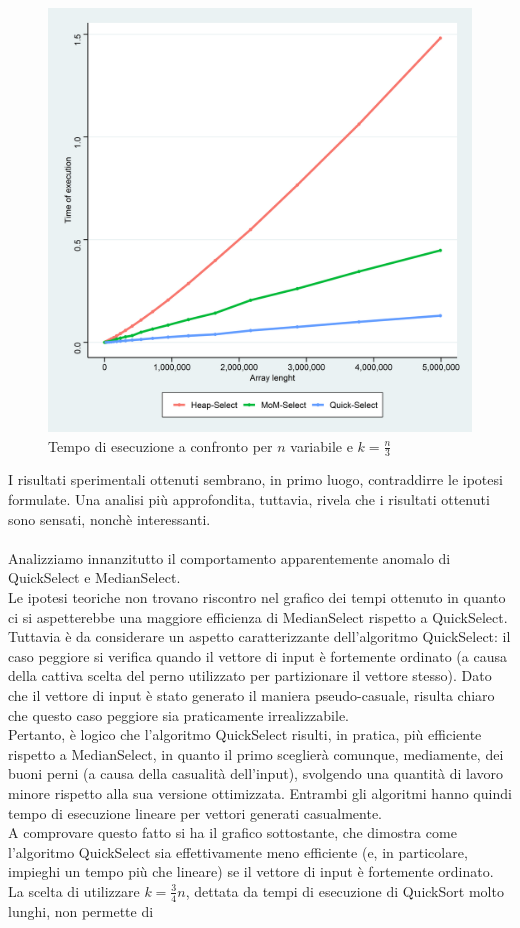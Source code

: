 \documentclass{article}
\begin{document}
	\begin{figure}[h!]
		\centering
  		\includegraphics[width=0.9	\columnwidth]{images/All_Basic_Times.png}
  		\caption{Tempo di esecuzione a confronto per $n$ variabile e $k=\frac{n}{3}$}
  		\label{fig:graph1}
	\end{figure}	
	
	I risultati sperimentali ottenuti sembrano, in primo luogo, contraddirre le ipotesi formulate. Una analisi più approfondita, tuttavia, rivela che i risultati ottenuti sono sensati, nonchè interessanti. 
	\\\\
	Analizziamo innanzitutto il comportamento apparentemente anomalo di QuickSelect e MedianSelect.
	\\
	Le ipotesi teoriche non trovano riscontro nel grafico dei tempi ottenuto in quanto ci si aspetterebbe una maggiore efficienza di MedianSelect rispetto a QuickSelect. Tuttavia è da considerare un aspetto caratterizzante dell'algoritmo QuickSelect: il caso peggiore si verifica quando il vettore di input è fortemente ordinato (a causa della cattiva scelta del perno utilizzato per partizionare il vettore stesso). Dato che il vettore di input è stato generato il maniera pseudo-casuale, risulta chiaro che questo caso peggiore sia praticamente irrealizzabile. 
	\\
	Pertanto, è logico che l'algoritmo QuickSelect risulti, in pratica, più efficiente rispetto a MedianSelect, in quanto il primo sceglierà comunque, mediamente, dei buoni perni (a causa della casualità dell'input), svolgendo una quantità di lavoro minore rispetto alla sua versione ottimizzata. Entrambi gli algoritmi hanno quindi tempo di esecuzione lineare per vettori generati casualmente. 
	\\ 
	A comprovare questo fatto si ha il grafico sottostante, che dimostra come l'algoritmo QuickSelect sia effettivamente meno efficiente (e, in particolare, impieghi un tempo più che lineare) se il vettore di input è fortemente ordinato. La scelta di utilizzare $k=\frac{3}{4}n$, dettata da tempi di esecuzione di QuickSort molto lunghi, non permette di 
	
\end{document}
